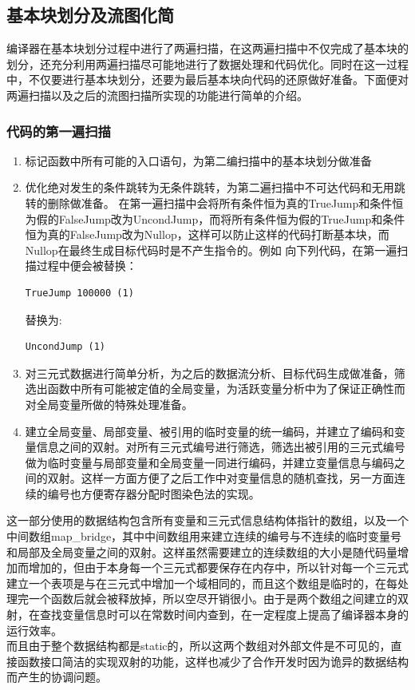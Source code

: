 \documentclass[12pt,a4paper,Flow]{report}
\begin{document}
\subsection{基本块划分及流图化简}
编译器在基本块划分过程中进行了两遍扫描，在这两遍扫描中不仅完成了基本块的划分，还充分利用两遍扫描尽可能地进行了数据处理和代码优化。同时在这一过程中，不仅要进行基本块划分，还要为最后基本块向代码的还原做好准备。下面便对两遍扫描以及之后的流图扫描所实现的功能进行简单的介绍。

\subsubsection{代码的第一遍扫描}
\begin{enumerate}
\item \leavevmode 标记函数中所有可能的入口语句，为第二编扫描中的基本块划分做准备
\item \leavevmode 优化绝对发生的条件跳转为无条件跳转，为第二遍扫描中不可达代码和无用跳转的删除做准备。
  在第一遍扫描中会将所有条件恒为真的TrueJump和条件恒为假的FalseJump改为UncondJump，而将所有条件恒为假的TrueJump和条件恒为真的FalseJump改为Nullop，这样可以防止这样的代码打断基本块，而Nullop在最终生成目标代码时是不产生指令的。例如  向下列代码，在第一遍扫描过程中便会被替换：
\begin{verbatim}
TrueJump 100000 (1)
\end{verbatim}
替换为:
\begin{verbatim}
UncondJump (1)
\end{verbatim}
\item \leavevmode 对三元式数据进行简单分析，为之后的数据流分析、目标代码生成做准备，筛选出函数中所有可能被定值的全局变量，为活跃变量分析中为了保证正确性而对全局变量所做的特殊处理准备。
\item \leavevmode 建立全局变量、局部变量、被引用的临时变量的统一编码，并建立了编码和变量信息之间的双射。对所有三元式编号进行筛选，筛选出被引用的三元式编号做为临时变量与局部变量和全局变量一同进行编码，并建立变量信息与编码之间的双射。这样一方面方便了之后工作中对变量信息的随机查找，另一方面连续的编号也方便寄存器分配时图染色法的实现。
\end{enumerate}
\indent 这一部分使用的数据结构包含所有变量和三元式信息结构体指针的数组，以及一个中间数组map\_bridge，其中中间数组用来建立连续的编号与不连续的临时变量号和局部及全局变量之间的双射。这样虽然需要建立的连续数组的大小是随代码量增加而增加的，但由于本身每一个三元式都要保存在内存中，所以针对每一个三元式建立一个表项是与在三元式中增加一个域相同的，而且这个数组是临时的，在每处理完一个函数后就会被释放掉，所以空尽开销很小。由于是两个数组之间建立的双射，在查找变量信息时可以在常数时间内查到，在一定程度上提高了编译器本身的运行效率。\\
\indent 而且由于整个数据结构都是static的，所以这两个数组对外部文件是不可见的，直接函数接口简洁的实现双射的功能，这样也减少了合作开发时因为诡异的数据结构而产生的协调问题。
\end{document}
